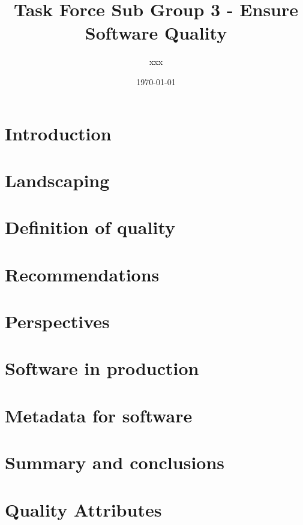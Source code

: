 \documentclass[a4paper]{article}
\title{Task Force Sub Group 3 - Ensure Software Quality}
\author{xxx}
\date{\today}https://www.overleaf.com/project/62387363b03e74262bbc0fdf
\begin{document}
\maketitle

\tableofcontents

\newpage
\section{Introduction}


\newpage
\section{Landscaping}


\section{Definition of quality}


\newpage
\section{Recommendations}


\newpage
\section{Perspectives}


\newpage
\section{Software in production}


\newpage
\section{Metadata for software}


\newpage
\section{Summary and conclusions}


\appendix

\newpage
\section{Quality Attributes}


\newpage
\printbibliography
\end{document}
